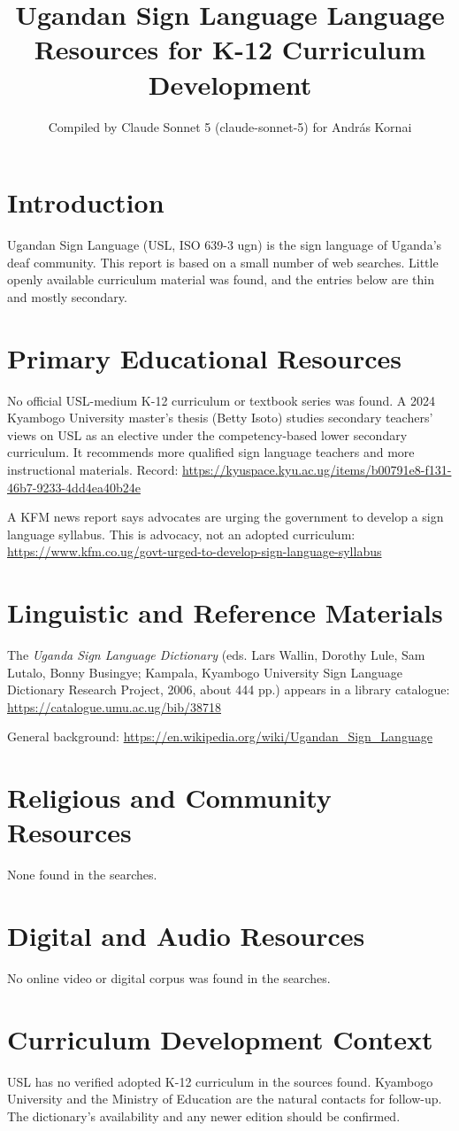 \documentclass[12pt]{article}
\title{Ugandan Sign Language Language Resources for K-12 Curriculum Development}
\author{Compiled by Claude Sonnet 5 (claude-sonnet-5) for Andr\'as Kornai}
\date{}
\begin{document}
\maketitle

\section{Introduction}
Ugandan Sign Language (USL, ISO 639-3 ugn) is the sign language of Uganda's deaf community. This report is based on a small number of web searches. Little openly available curriculum material was found, and the entries below are thin and mostly secondary.

\section{Primary Educational Resources}
No official USL-medium K-12 curriculum or textbook series was found. A 2024 Kyambogo University master's thesis (Betty Isoto) studies secondary teachers' views on USL as an elective under the competency-based lower secondary curriculum. It recommends more qualified sign language teachers and more instructional materials. Record: \url{https://kyuspace.kyu.ac.ug/items/b00791e8-f131-46b7-9233-4dd4ea40b24e}

A KFM news report says advocates are urging the government to develop a sign language syllabus. This is advocacy, not an adopted curriculum: \url{https://www.kfm.co.ug/govt-urged-to-develop-sign-language-syllabus}

\section{Linguistic and Reference Materials}
The \emph{Uganda Sign Language Dictionary} (eds. Lars Wallin, Dorothy Lule, Sam Lutalo, Bonny Busingye; Kampala, Kyambogo University Sign Language Dictionary Research Project, 2006, about 444 pp.) appears in a library catalogue: \url{https://catalogue.umu.ac.ug/bib/38718}

General background: \url{https://en.wikipedia.org/wiki/Ugandan_Sign_Language}

\section{Religious and Community Resources}
None found in the searches.

\section{Digital and Audio Resources}
No online video or digital corpus was found in the searches.

\section{Curriculum Development Context}
USL has no verified adopted K-12 curriculum in the sources found. Kyambogo University and the Ministry of Education are the natural contacts for follow-up. The dictionary's availability and any newer edition should be confirmed.
\end{document}
